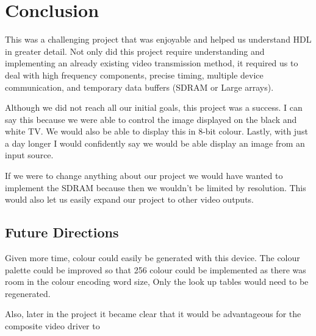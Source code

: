 \section{Conclusion}
This was a challenging project that was enjoyable and helped us understand HDL
in greater detail. Not only did this project require understanding and 
implementing an already existing video transmission method, it required us 
to deal with high frequency components, precise timing, multiple device 
communication, and temporary data buffers (SDRAM or Large arrays).

Although we did not reach all our initial goals, this project was a success. 
I can say this because we were able to control the image displayed on the black
and white TV. We would also be able to display this in 8-bit colour. Lastly, 
with just a day longer I would confidently say we would be able display an 
image from an input source.

If we were to change anything about our project we would have wanted to implement
the SDRAM because then we wouldn't be limited by resolution. This would also
let us easily expand our project to other video outputs.


\subsection{Future Directions}

Given more time, colour could easily be generated with this device. The colour
palette could be improved so that 256 colour could be implemented as there was
room in the colour encoding word size, Only the look up tables would need to be
regenerated. 

Also, later in the project it became clear that it would be advantageous for the
composite video driver to 

